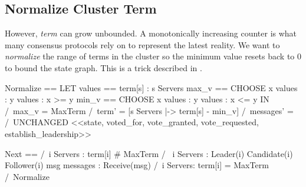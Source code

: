 \subsection{Normalize Cluster Term}

However, \textit{term} can grow unbounded. A monotonically increasing counter is
what many consensus protocols rely on to represent the latest reality. We want to
\textit{normalize} the range of terms in the cluster so the minimum value resets
back to 0 to bound the state graph. This is a trick described in \cite{finite}.
\\

\begin{tla}
Normalize == 
    LET 
        values == {term[s] : s \in Servers}
        max_v == CHOOSE x \in values : \A y \in values : x >= y
        min_v == CHOOSE x \in values : \A y \in values : x <= y
    IN 
        /\ max_v = MaxTerm
        /\ term' = [s \in Servers |-> term[s] - min_v]
        /\ messages' = {}
        /\ UNCHANGED <<state, voted_for, 
            vote_granted, vote_requested, establish_leadership>>

Next == 
    \/ /\ \A i \in Servers : term[i] # MaxTerm 
       /\ \/ \E i \in Servers : 
                \/ Leader(i) 
                \/ Candidate(i)
                \/ Follower(i)
          \/ \E msg \in messages : Receive(msg)
    \/ /\ \E i \in Servers: term[i] = MaxTerm 
       /\ Normalize
\end{tla}
\begin{tlatex}
%
%
%
%
%
%
%
\@pvspace{8.0pt}%
%
%
%
%
%
%
%
\end{tlatex}
\newline

